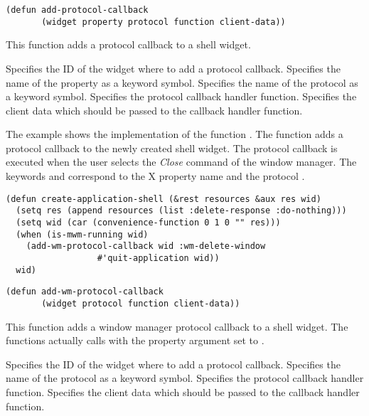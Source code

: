 \begin{lispd}
\syntax\begin{verbatim}
(defun add-protocol-callback 
       (widget property protocol function client-data))
\end{verbatim}
\beschr This function adds a protocol callback to a shell widget.
\parameter
\begin{paramd}
 Specifies the ID of the widget where to add a protocol callback.
 Specifies the name of the property as a keyword symbol.
 Specifies the name of the protocol as a keyword symbol.
 Specifies the protocol callback handler function.
 Specifies the client data which should be passed to the
callback handler function.
\end{paramd}
\beispiel\normalsize The example shows the implementation of the function
.  The function adds a protocol callback to the newly
created shell widget. The protocol callback is executed when the user selects
the {\it Close} command of the  window manager. The keywords
 and  correspond to the X property name
 and the protocol .

\fnsize\begin{verbatim}
(defun create-application-shell (&rest resources &aux res wid)
  (setq res (append resources (list :delete-response :do-nothing)))
  (setq wid (car (convenience-function 0 1 0 "" res)))
  (when (is-mwm-running wid)
    (add-wm-protocol-callback wid :wm-delete-window
			      #'quit-application wid))
  wid)
\end{verbatim}
\end{lispd}

\begin{lispd}
\syntax\begin{verbatim}
(defun add-wm-protocol-callback 
       (widget protocol function client-data))
\end{verbatim}
\beschr This function adds a window manager protocol callback to a shell widget.
The functions actually calls  with the property
argument set to .
\parameter
\begin{paramd}
 Specifies the ID of the widget where to add a protocol callback.
 Specifies the name of the protocol as a keyword symbol.
 Specifies the protocol callback handler function.
 Specifies the client data which should be passed to the
callback handler function.
\end{paramd}
\end{lispd}

